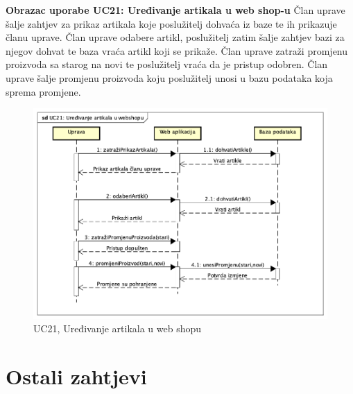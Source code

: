 			\pagebreak
			\textbf{Obrazac uporabe UC21: Uređivanje artikala u web shop-u}
			\bigbreak
			\textnormal {Član uprave šalje zahtjev za prikaz artikala koje poslužitelj dohvaća iz baze te ih prikazuje članu uprave. Član uprave odabere artikl, poslužitelj zatim šalje zahtjev bazi za njegov dohvat te baza vraća artikl koji se prikaže. Član uprave zatraži promjenu proizvoda sa starog na novi te poslužitelj vraća da je pristup odobren. Član uprave šalje promjenu proizvoda koju poslužitelj unosi u bazu podataka koja sprema promjene.}
				\begin{figure}[H]
					\includegraphics[width=\linewidth]{dijagrami/UC21.png}
					\centering
					\caption{UC21, Uređivanje artikala u web shopu}
					\label{fig:SequanceDiagram4}
				\end{figure}
	\eject
		\section{Ostali zahtjevi}
		
